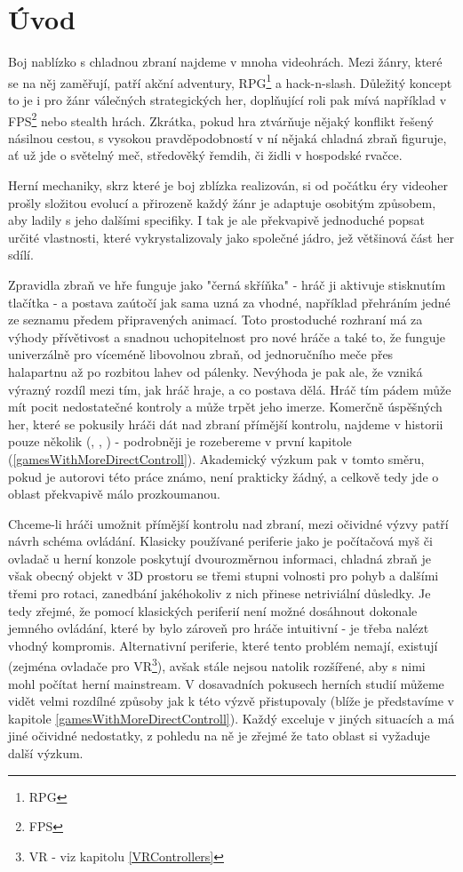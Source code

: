 \chapter*{Úvod}

Boj nablízko s chladnou zbraní najdeme v mnoha videohrách. Mezi žánry, které se na něj zaměřují, patří akční adventury, RPG\footnote{\Acl{RPG}} a hack-n-slash. Důležitý koncept to je i pro žánr válečných strategických her, doplňující roli pak mívá například v FPS\footnote{\Acl{FPS}} nebo stealth hrách. Zkrátka, pokud hra ztvárňuje nějaký konflikt řešený násilnou cestou, s vysokou pravděpodobností v ní nějaká chladná zbraň figuruje, ať už jde o světelný meč, středověký řemdih, či židli v hospodské rvačce.

Herní mechaniky, skrz které je boj zblízka realizován, si od počátku éry videoher prošly složitou evolucí a přirozeně každý žánr je adaptuje osobitým způsobem, aby ladily s jeho dalšími specifiky. I tak je ale překvapivě jednoduché popsat určité vlastnosti, které vykrystalizovaly jako společné jádro, jež většinová část her sdílí.

Zpravidla zbraň ve hře funguje jako "černá skříňka" - hráč ji aktivuje stisknutím tlačítka - a postava zaútočí jak sama uzná za vhodné, například přehráním jedné ze seznamu předem připravených animací. Toto prostoduché rozhraní má za výhody přívětivost a snadnou uchopitelnost pro nové hráče a také to, že funguje univerzálně pro víceméně libovolnou zbraň, od jednoručního meče přes halapartnu až po rozbitou lahev od pálenky. Nevýhoda je pak ale, že vzniká výrazný rozdíl mezi tím, jak hráč hraje, a co postava dělá. Hráč tím pádem může mít pocit nedostatečné kontroly a může trpět jeho imerze. Komerčně úspěšných her, které se pokusily hráči dát nad zbraní přímější kontrolu, najdeme v historii pouze několik (\cite{DieByTheSword}, \cite{MountAndBlade}, \cite{KCD}) - podrobněji je rozebereme v první kapitole (\ref{gamesWithMoreDirectControll}). Akademický výzkum pak v tomto směru, pokud je autorovi této práce známo, není prakticky žádný, a celkově tedy jde o oblast překvapivě málo prozkoumanou.
  
Chceme-li hráči umožnit přímější kontrolu nad zbraní, mezi očividné výzvy patří návrh schéma ovládání. Klasicky používané periferie jako je počítačová myš či ovladač u herní konzole poskytují dvourozměrnou informaci, chladná zbraň je však obecný objekt v 3D prostoru se třemi stupni volnosti pro pohyb a dalšími třemi pro rotaci, zanedbání jakéhokoliv z nich přinese netriviální důsledky. Je tedy zřejmé, že pomocí klasických periferií není možné dosáhnout dokonale jemného ovládání, které by bylo zároveň pro hráče intuitivní - je třeba nalézt vhodný kompromis. Alternativní periferie, které tento problém nemají, existují (zejména ovladače pro VR\footnote{\Acl{VR} - viz kapitolu \ref{VRControllers}}), avšak stále nejsou natolik rozšířené, aby s nimi mohl počítat herní mainstream. V dosavadních pokusech herních studií můžeme vidět velmi rozdílné způsoby jak k této výzvě přistupovaly (blíže je představíme v kapitole \ref{gamesWithMoreDirectControll}). Každý exceluje v jiných situacích a má jiné očividné nedostatky, z pohledu na ně je zřejmé že tato oblast si vyžaduje další výzkum. 

